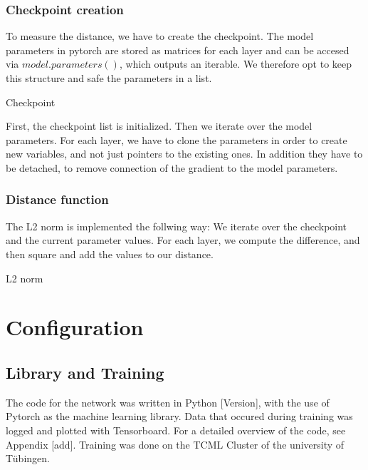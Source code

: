 \subsubsection{Checkpoint creation}
To measure the distance, we have to create the checkpoint. The model parameters
in pytorch are stored as matrices for each layer and can be accesed via
$model.parameters()$, which outputs an iterable. We therefore opt to keep this
structure and safe the parameters in a list.
\begin{algorithm}[h!]
    \caption{Checkpoint}\label{alg:Checkpoint}
    \lstset{language=Python}
    
\end{algorithm}
\newline
First, the checkpoint list is initialized. Then we iterate over the model
parameters. For each layer, we have to clone the parameters in order to create
new variables, and not just pointers to the existing ones. In addition they have
to be detached, to remove connection of the gradient to the model parameters.

\subsubsection{Distance function}
The L2 norm is implemented the follwing way: We iterate over the checkpoint and
the current parameter values. For each layer, we compute the difference, and
then square and add the values to our distance.
\begin{algorithm}[h!]
    \caption{L2 norm}\label{alg:L2Norm}
    \lstset{language=Python}
    
\end{algorithm}



\section{Configuration}

\subsection{Library and Training}
The code for the network was written in Python [Version], with the use of
Pytorch \cite{NEURIPS2019_9015} as the machine learning library. Data that occured during training was
logged and plotted with Tensorboard. For a detailed overview of the code, see
Appendix [add]. Training was done on the TCML Cluster of the university of Tübingen.

